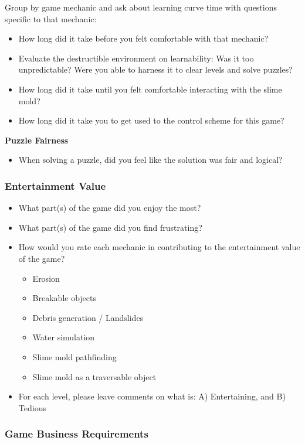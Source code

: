 \documentclass[12pt, titlepage]{article}
\begin{document}
Group by game mechanic and ask about learning curve time with questions specific to that mechanic:

\begin{itemize}
  \item How long did it take before you felt comfortable with that mechanic?
  \item Evaluate the destructible environment on learnability: Was it too unpredictable? Were you able to harness it to clear levels and solve puzzles?
  \item How long did it take until you felt comfortable interacting with the slime mold?
  \item How long did it take you to get used to the control scheme for this game?
\end{itemize}

\textbf{Puzzle Fairness}

\begin{itemize}
  \item When solving a puzzle, did you feel like the solution was fair and logical?
\end{itemize}

\subsubsection{Entertainment Value}

\begin{itemize}
  \item What part(s) of the game did you enjoy the most?
  \item What part(s) of the game did you find frustrating?
  \item How would you rate each mechanic in contributing to the entertainment value of the game?
  \begin{itemize}
    \item Erosion
    \item Breakable objects
    \item Debris generation / Landslides
    \item Water simulation
    \item Slime mold pathfinding
    \item Slime mold as a traversable object
  \end{itemize}
  \item For each level, please leave comments on what is: A) Entertaining, and B) Tedious
\end{itemize}

\subsubsection{Game Business Requirements}
\end{document}

